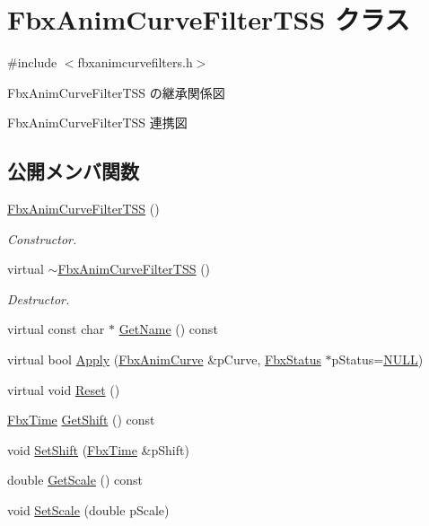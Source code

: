 \hypertarget{class_fbx_anim_curve_filter_t_s_s}{}\section{Fbx\+Anim\+Curve\+Filter\+T\+SS クラス}
\label{class_fbx_anim_curve_filter_t_s_s}


{\ttfamily \#include $<$fbxanimcurvefilters.\+h$>$}



Fbx\+Anim\+Curve\+Filter\+T\+SS の継承関係図


Fbx\+Anim\+Curve\+Filter\+T\+SS 連携図
\subsection*{公開メンバ関数}
\begin{DoxyCompactItemize}
\item 
\hyperlink{class_fbx_anim_curve_filter_t_s_s_a31c1875bfeb94aec880e46c449853409}{Fbx\+Anim\+Curve\+Filter\+T\+SS} ()
\begin{DoxyCompactList}\small\item\em Constructor. \end{DoxyCompactList}\item 
virtual \hyperlink{class_fbx_anim_curve_filter_t_s_s_a6bf44d1312b857b4a866ba0b09f4a027}{$\sim$\+Fbx\+Anim\+Curve\+Filter\+T\+SS} ()
\begin{DoxyCompactList}\small\item\em Destructor. \end{DoxyCompactList}\item 
virtual const char $\ast$ \hyperlink{class_fbx_anim_curve_filter_t_s_s_acf96262688c855b1c9b5ead93247e758}{Get\+Name} () const
\item 
virtual bool \hyperlink{class_fbx_anim_curve_filter_t_s_s_a5ae3b50e72c3eb6846938a01b3559b21}{Apply} (\hyperlink{class_fbx_anim_curve}{Fbx\+Anim\+Curve} \&p\+Curve, \hyperlink{class_fbx_status}{Fbx\+Status} $\ast$p\+Status=\hyperlink{fbxarch_8h_a070d2ce7b6bb7e5c05602aa8c308d0c4}{N\+U\+LL})
\item 
virtual void \hyperlink{class_fbx_anim_curve_filter_t_s_s_aebf5798bd833f7dced2a11aea61b1c35}{Reset} ()
\item 
\hyperlink{class_fbx_time}{Fbx\+Time} \hyperlink{class_fbx_anim_curve_filter_t_s_s_aee0e42f4c5e802418408d0c0640f9b98}{Get\+Shift} () const
\item 
void \hyperlink{class_fbx_anim_curve_filter_t_s_s_a7f8c6250190a961284e894e977b4233f}{Set\+Shift} (\hyperlink{class_fbx_time}{Fbx\+Time} \&p\+Shift)
\item 
double \hyperlink{class_fbx_anim_curve_filter_t_s_s_a0b5ee5c02fdbc4cd8cfadaa5f761280d}{Get\+Scale} () const
\item 
void \hyperlink{class_fbx_anim_curve_filter_t_s_s_a0f3661baf7b2511fb6d9a292d19a31dc}{Set\+Scale} (double p\+Scale)
\end{DoxyCompactItemize}
